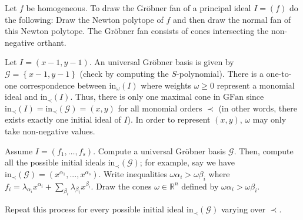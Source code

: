 \documentclass[a4paper, 11pt]{article}
\begin{document}
\begin{eg}
  Let \( f \) be homogeneous.
  To draw the Gröbner fan of a principal ideal \( I = (f) \) do the following: Draw the Newton polytope of \( f \) and then draw the normal fan of this Newton polytope. The Gröbner fan consists of cones intersecting the non-negative orthant.
\end{eg}


\begin{eg}
  Let \( I = (x-1, y-1) \). An universal Gröbner basis is given by \( \mathcal{G} = \left\{ x-1, y-1 \right\} \) (check by computing the \( S \)-polynomial). There is a one-to-one correspondence between \( \mathrm{in}_{\omega}(I) \) where weights \( \omega \geq 0 \) represent a monomial ideal and \( \mathrm{in}_{\prec}(I) \). Thus, there is only one maximal cone in \( \mathrm{GFan} \) since \( \mathrm{in}_{\prec}(I) = \mathrm{in}_\prec(\mathcal{G}) = (x,y) \) for all monomial orders \( \prec \) (in other words, there exists exactly one initial ideal of \( I \)). In order to represent \( (x,y) \), \( \omega \) may only take non-negative values.
  \begin{figure}[H]
    \centering
  \end{figure}
\end{eg}

\begin{remark}
  Assume \( I = (f_1, \dots, f_s) \). Compute a universal Gröbner basis \( \mathcal{G} \). Then, compute all the possible initial ideals \( \mathrm{in}_{\prec}(\mathcal{G}) \); for example, say we have \( \mathrm{in}_{\prec}(\mathcal{G}) = (x^{\alpha_1}, ... , x^{\alpha_s}) \). Write inequalities \( \omega \alpha_i > \omega \beta_i \) where \( f_i = \lambda_{\alpha_i} x^{\alpha_i} + \sum_{\beta_i} \lambda_{\beta_i} x^{\beta_i} \). Draw the cones \( \omega \in \mathbb R^n \) defined by \(  \omega \alpha_i > \omega \beta_i  \).

  Repeat this process for every possible initial ideal \( \mathrm{in}_\prec(\mathcal{G}) \) varying over \( \prec \).
\end{remark}
\end{document}
